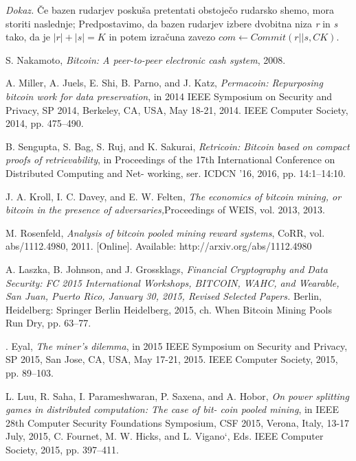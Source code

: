 \documentclass[12pt]{article}
\begin{document}
\noindent \textit{Dokaz.} Če bazen rudarjev poskuša pretentati obstoječo rudarsko shemo, mora storiti naslednje; Predpostavimo, da bazen rudarjev izbere dvobitna niza \textit{r} in \textit{s} tako, da je \textit{$|r| + |s| = K$} in potem izračuna zavezo \textit{$com \leftarrow Commit(r||s, CK)$}.

\newpage
\begin{thebibliography}{9}
 
 S. Nakamoto, 
 \textit{Bitcoin: A peer-to-peer electronic cash system}, 2008.
 
 A. Miller, A. Juels, E. Shi, B. Parno, and J. Katz, 
 \textit{Permacoin: Repurposing bitcoin work for data preservation}, in 2014 IEEE Symposium on Security and Privacy, SP 2014, Berkeley, CA, USA, May 18-21, 2014. IEEE Computer Society, 2014, pp. 475–490.
 
 B. Sengupta, S. Bag, S. Ruj, and K. Sakurai, 
 \textit{Retricoin: Bitcoin based on compact proofs of retrievability}, in Proceedings of the 17th International Conference on Distributed Computing and Net- working, ser. ICDCN ’16, 2016, pp. 14:1–14:10.
 
 J. A. Kroll, I. C. Davey, and E. W. Felten, 
 \textit{The economics of bitcoin mining, or bitcoin in the presence of adversaries,}Proceedings of WEIS, vol. 2013, 2013.
 
 M. Rosenfeld,
 \textit{Analysis of bitcoin pooled mining reward systems}, CoRR, vol. abs/1112.4980, 2011. [Online]. Available: http://arxiv.org/abs/1112.4980
 
 A. Laszka, B. Johnson, and J. Grossklags, 
 \textit{Financial Cryptography and Data Security: FC 2015 International Workshops, BITCOIN, WAHC, and Wearable, San Juan, Puerto Rico, January 30, 2015, Revised Selected Papers.} Berlin, Heidelberg: Springer Berlin Heidelberg, 2015, ch. When Bitcoin Mining Pools Run Dry, pp. 63–77.
 
 . Eyal, 
 \textit{The miner’s dilemma}, in 2015 IEEE Symposium on Security and Privacy, SP 2015, San Jose, CA, USA, May 17-21, 2015. IEEE Computer Society, 2015, pp. 89–103.
 
 L. Luu, R. Saha, I. Parameshwaran, P. Saxena, and A. Hobor, 
 \textit{On power splitting games in distributed computation: The case of bit- coin pooled mining}, in IEEE 28th Computer Security Foundations Symposium, CSF 2015, Verona, Italy, 13-17 July, 2015, C. Fournet, M. W. Hicks, and L. Vigano`, Eds. IEEE Computer Society, 2015, pp. 397–411.
 

\end{thebibliography}
\end{document}
